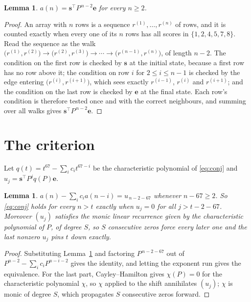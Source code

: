 \documentclass[11pt,a4paper]{article}
\theoremstyle{plain}
\newtheorem{lemma}[theorem]{Lemma}
\theoremstyle{definition}
\begin{document}
\begin{lemma}\label{lem:walk}
$a(n)=\mathbf{s}^{\!\top}P^{\,n-2}\mathbf{e}$ for every $n\ge2$.
\end{lemma}

\begin{proof}
An array with $n$ rows is a sequence $r^{(1)},\dots,r^{(n)}$ of rows, and it is counted
exactly when every one of its $n$ rows has all scores in $\{1,2,4,5,7,8\}$. Read the sequence as the
walk $\bigl(r^{(1)},r^{(2)}\bigr)\to\bigl(r^{(2)},r^{(3)}\bigr)\to\cdots\to
\bigl(r^{(n-1)},r^{(n)}\bigr)$, of length $n-2$. The condition on the first row is
checked by $\mathbf{s}$ at the initial state, because a first row has no row above it; the
condition on row $i$ for $2\le i\le n-1$ is checked by the edge entering
$\bigl(r^{(i)},r^{(i+1)}\bigr)$, which sees exactly $r^{(i-1)}$, $r^{(i)}$ and
$r^{(i+1)}$; and the condition on the last row is checked by $\mathbf{e}$ at the final
state. Each row's condition is therefore tested once and with the correct neighbours, and
summing over all walks gives $\mathbf{s}^{\!\top}P^{\,n-2}\mathbf{e}$.
\end{proof}

\section{The criterion}

Let $q(t)=t^{67}-\sum_i c_i t^{67-i}$ be the characteristic polynomial of
\eqref{eq:conj} and $u_j=\mathbf{s}^{\!\top}P^{j}q(P)\mathbf{e}$.

\begin{lemma}\label{lem:crit}
$a(n)-\sum_i c_i a(n-i)=u_{\,n-2-67}$ whenever $n-67\ge2$. So \eqref{eq:conj}
holds for every $n>t$ exactly when $u_j=0$ for all $j>t-2-67$. Moreover $(u_j)$
satisfies the monic linear recurrence given by the characteristic polynomial of $P$, of
degree $S$, so $S$ consecutive zeros force every later one and the last nonzero $u_j$ pins
$t$ down exactly.
\end{lemma}

\begin{proof}
Substituting Lemma~\ref{lem:walk} and factoring $P^{\,n-2-67}$ out of
$P^{n-2}-\sum_i c_i P^{n-i-2}$ gives the identity, and letting the exponent run gives the
equivalence. For the last part, Cayley--Hamilton gives $\chi(P)=0$ for the characteristic
polynomial $\chi$, so $\chi$ applied to the shift annihilates $(u_j)$; $\chi$ is monic of
degree $S$, which propagates $S$ consecutive zeros forward.
\end{proof}
\end{document}
